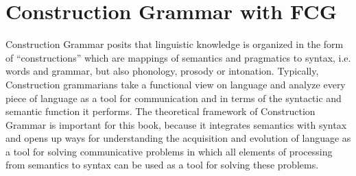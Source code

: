 %

\chapter{Construction Grammar with FCG}
\label{s:fcg}
Construction Grammar posits that  linguistic
knowledge is organized in the form of ``constructions'' \citep{goldberg1995constructions,croft2001radical}
which are mappings of semantics and pragmatics to syntax, 
i.e. words and grammar, but also phonology, prosody or intonation. 
Typically, Construction grammarians take a functional view on language
and analyze every piece of language as a tool for communication and 
in terms of the syntactic and semantic function it performs.
The theoretical framework of Construction Grammar
is important for this book, because it integrates 
semantics with syntax and opens up 
ways for understanding the acquisition and evolution
of language as a tool for solving communicative problems 
in which all elements of processing from semantics to
syntax can be used as a tool for solving these
problems. 

